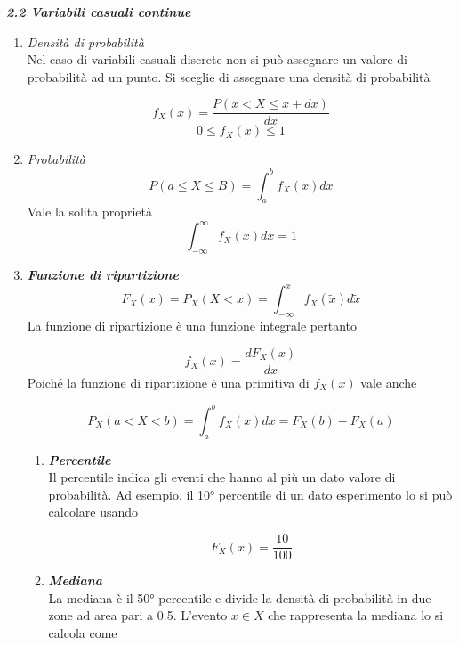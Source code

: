 \documentclass[]{article}
\begin{document}
\newpage

\textit{\textbf{2.2 Variabili casuali continue}}

\begin{enumerate}
\item \textit{Densità di probabilità}
\\ Nel caso di variabili casuali discrete non si può assegnare un valore di probabilità ad un punto. Si sceglie di assegnare una densità di probabilità

\begin{equation}
f_X(x)=\frac{P(x<X\leq x+dx)}{dx}
\end{equation}
\[0 \leq f_X(x) \leq 1 \] 

\item \textit{Probabilità}
\begin{equation}
P(a\leq X \leq B)= \int_a^b f_X(x) dx
\end{equation}
Vale la solita proprietà
\[ \int_{-\infty}^{\infty} f_X(x) dx=1\]

\item \textit{\textbf{Funzione di ripartizione}}
\begin{equation}
F_X(x)=P_X(X<x)=\int_{-\infty}^{x} f_X(\tilde{x})d \tilde{x}
\end{equation}
La funzione di ripartizione è una funzione integrale pertanto 

\begin{equation}
f_X(x)= \frac{dF_X(x)}{dx}
\end{equation}
Poiché la funzione di ripartizione è una primitiva di $f_X(x)$ vale anche

\begin{equation}
P_X(a<X<b)=\int_{a}^{b} f_X(x)d x= F_X(b)- F_X(a)
\end{equation}

\begin{enumerate}
\item \textit{\textbf{Percentile}} \\
Il percentile indica gli eventi che hanno al più un dato valore di probabilità. Ad esempio, il 10° percentile di un dato esperimento lo si può calcolare usando

\begin{equation}
F_X(x)=\frac{10}{100}
\end{equation}

\item \textit{\textbf{Mediana}} \\
La mediana è il 50° percentile e divide la densità di probabilità in due zone ad area pari a 0.5. L'evento $x \in X$ che rappresenta la mediana lo si calcola come


\end{enumerate}
\end{enumerate}
\end{document}
